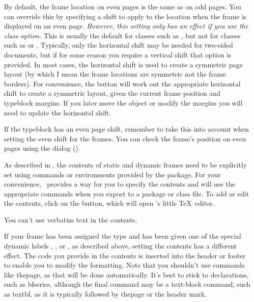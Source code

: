 
By default, the frame location on even pages is the same
 as on odd pages. You can override this by
specifying a shift to apply to the location when the frame is
displayed on an even page. \emph{However, this setting only has an effect
if you use the  class option.} This is usually
the default for classes such as , but not for classes
such as  or . Typically, only the
horizontal shift may be needed for two-sided documents, but if for some
reason you require a vertical shift that option is provided. In most
cases, the horizontal shift is used to create a symmetric page
layout (by which I mean the frame locations are symmetric not the
frame borders). For convenience, the
 button will work out
the appropriate horizontal shift to create a symmetric layout, given
the current frame position and \gls{typeblock} margins. If you later move
the \gls{object} or modify the margins you will need to update the
horizontal shift.

\begin{warning}
If the \gls{typeblock} has an even page shift, remember to take this into
account when setting the even shift for the frames. You can check
the frame's position on even pages using the 
dialog ().
\end{warning}


As described in , the contents of
static and dynamic frames need to be explicitly set using commands
or environments provided by the  package. For your
convenience, \FlowframTk\ provides a way for you to specify the
contents and will use the appropriate commands when you export to a
package or class file.
To add or edit the contents, click on the
 button, which will open
\FlowframTk's little \TeX\ editor.

\begin{important}
You can't use verbatim text in the contents.
\end{important}

If your frame has been assigned the
 type and has been given one of
the special dynamic labels , ,
 or , as described above,
setting the contents has a different effect. The code you provide in
the contents is inserted into the header or footer to enable you to
modify the formatting. Note that you shouldn't use commands like
\gls{thepage}, as that will be done automatically. It's best to
stick to declarations, such as \gls{bfseries}, although the
final command may be a text-block command, such as \gls{textbf},
as it is typically followed by \gls{thepage} or the header mark.

